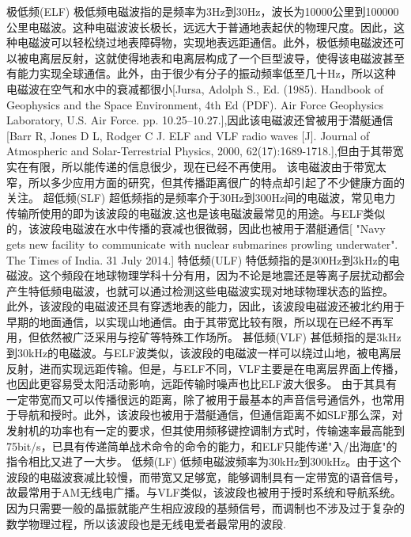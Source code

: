 \documentclass[UTF8]{article}
\begin{document}
\begin{CJK}{UTF8}{gkai}
 极低频(ELF)
极低频电磁波指的是频率为3Hz到30Hz，波长为10000公里到100000公里电磁波。这种电磁波波长极长，远远大于普通地表起伏的物理尺度。因此，这种电磁波可以轻松绕过地表障碍物，实现地表远距通信。此外，极低频电磁波还可以被电离层反射，这就使得地表和电离层构成了一个巨型波导，使得该电磁波甚至有能力实现全球通信。此外，由于很少有分子的振动频率低至几十Hz，所以这种电磁波在空气和水中的衰减都很小[Jursa, Adolph S., Ed. (1985). Handbook of Geophysics and the Space Environment, 4th Ed (PDF). Air Force Geophysics Laboratory, U.S. Air Force. pp. 10.25–10.27.],因此该电磁波还曾被用于潜艇通信[Barr R, Jones D L, Rodger C J. ELF and VLF radio waves [J]. Journal of Atmospheric and Solar-Terrestrial Physics, 2000, 62(17):1689-1718.],但由于其带宽实在有限，所以能传递的信息很少，现在已经不再使用。
该电磁波由于带宽太窄，所以多少应用方面的研究，但其传播距离很广的特点却引起了不少健康方面的关注。
 超低频(SLF)
超低频指的是频率介于30Hz到300Hz间的电磁波，常见电力传输所使用的即为该波段的电磁波,这也是该电磁波最常见的用途。与ELF类似的，该波段电磁波在水中传播的衰减也很微弱，因此也被用于潜艇通信[ "Navy gets new facility to communicate with nuclear submarines prowling underwater". The Times of India. 31 July 2014.]
 特低频(ULF)
特低频指的是300Hz到3kHz的电磁波。这个频段在地球物理学科十分有用，因为不论是地震还是等离子层扰动都会产生特低频电磁波，也就可以通过检测这些电磁波实现对地球物理状态的监控。
此外，该波段的电磁波还具有穿透地表的能力，因此，该波段电磁波还被北约用于早期的地面通信，以实现山地通信。由于其带宽比较有限，所以现在已经不再军用，但依然被广泛采用与挖矿等特殊工作场所。
 甚低频(VLF)
甚低频指的是3kHz到30kHz的电磁波。与ELF波类似，该波段的电磁波一样可以绕过山地，被电离层反射，进而实现远距传输。但是，与ELF不同，VLF主要是在电离层界面上传播，也因此更容易受太阳活动影响，远距传输时噪声也比ELF波大很多。
由于其具有一定带宽而又可以传播很远的距离，除了被用于最基本的声音信号通信外，也常用于导航和授时。此外，该波段也被用于潜艇通信，但通信距离不如SLF那么深，对发射机的功率也有一定的要求，但其使用频移键控调制方式时，传输速率最高能到75bit/s，已具有传递简单战术命令的命令的能力，和ELF只能传递"入/出海底"的指令相比又进了一大步。
 低频(LF)
低频电磁波频率为30kHz到300kHz。由于这个波段的电磁波衰减比较慢，而带宽又足够宽，能够调制具有一定带宽的语音信号，故最常用于AM无线电广播。与VLF类似，该波段也被用于授时系统和导航系统。
因为只需要一般的晶振就能产生相应波段的基频信号，而调制也不涉及过于复杂的数学物理过程，所以该波段也是无线电爱者最常用的波段.

\end{CJK}
\end{document}
